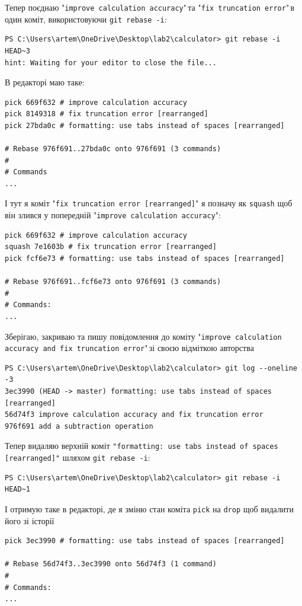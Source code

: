 \documentclass[a4paper,12pt]{article}
\begin{document}
    Тепер поєднаю "\texttt{improve calculation accuracy}"\,та "\texttt{fix truncation error}"\,в один коміт, використовуючи \texttt{git rebase -i}:

    \begin{verbatim}
PS C:\Users\artem\OneDrive\Desktop\lab2\calculator> git rebase -i HEAD~3
hint: Waiting for your editor to close the file...
    \end{verbatim}

    В редакторі маю таке:
    \begin{verbatim}
pick 669f632 # improve calculation accuracy
pick 8149318 # fix truncation error [rearranged]
pick 27bda0c # formatting: use tabs instead of spaces [rearranged]

# Rebase 976f691..27bda0c onto 976f691 (3 commands)
#
# Commands
...
    \end{verbatim}

    І тут я коміт "\texttt{fix truncation error [rearranged]}" я позначу як \texttt{squash} щоб він злився у попередній
    "\texttt{improve calculation accuracy}":
    \begin{verbatim}
pick 669f632 # improve calculation accuracy
squash 7e1603b # fix truncation error [rearranged]
pick fcf6e73 # formatting: use tabs instead of spaces [rearranged]

# Rebase 976f691..fcf6e73 onto 976f691 (3 commands)
#
# Commands:
...
    \end{verbatim}

    Зберігаю, закриваю та пишу повідомлення до коміту "\texttt{improve calculation accuracy and fix truncation error}"\,зі своєю відміткою авторства
\begin{verbatim}
PS C:\Users\artem\OneDrive\Desktop\lab2\calculator> git log --oneline -3
3ec3990 (HEAD -> master) formatting: use tabs instead of spaces [rearranged]
56d74f3 improve calculation accuracy and fix truncation error
976f691 add a subtraction operation
    \end{verbatim}

    Тепер видаляю верхній коміт \texttt{"formatting: use tabs instead of spaces [rearranged]"} шляхом \texttt{git rebase -i}:

    \begin{verbatim}
PS C:\Users\artem\OneDrive\Desktop\lab2\calculator> git rebase -i HEAD~1
    \end{verbatim}

    І отримую таке в редакторі, де я зміню стан коміта \texttt{pick} на \texttt{drop} щоб видалити його зі історії
    \begin{verbatim}
pick 3ec3990 # formatting: use tabs instead of spaces [rearranged]

# Rebase 56d74f3..3ec3990 onto 56d74f3 (1 command)
#
# Commands:
...
    \end{verbatim}
\end{document}
